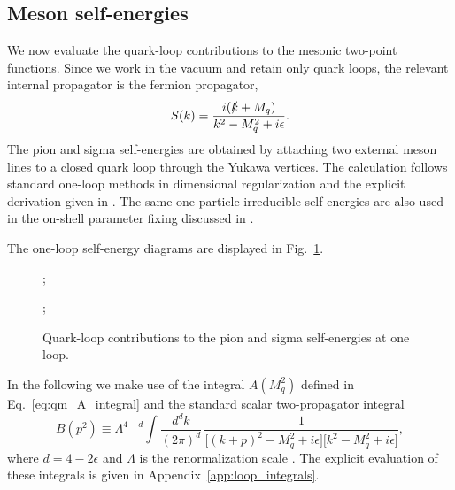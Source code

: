 \subsection*{Meson self-energies}

We now evaluate the quark-loop contributions to the mesonic two-point
functions. Since we work in the vacuum and retain only quark loops,
the relevant internal propagator is the fermion propagator,
\begin{equation}
S(k)=\frac{i(\slashed{k}+M_q)}{k^2-M_q^2+i\epsilon}.
\end{equation}
The pion and sigma self-energies are obtained by attaching two
external meson lines to a closed quark loop through the Yukawa
vertices. The calculation follows standard one-loop methods in
dimensional regularization \cite{PeskinSchroeder1995,WeinbergQFT} and
the explicit derivation given in \cite{Folkestad2018}. The same
one-particle-irreducible self-energies are also used in the on-shell
parameter fixing discussed in \cite{Andersen2024}.

The one-loop self-energy diagrams are displayed in
Fig.~\ref{fig:qm_selfenergy_diagrams}.

\begin{figure}[htbp]
\centering
\begin{minipage}{0.47\textwidth}
\centering
{};
\end{minipage}
\hfill
\begin{minipage}{0.47\textwidth}
\centering
{};
\end{minipage}
\caption{Quark-loop contributions to the pion and sigma self-energies at one loop.}
\label{fig:qm_selfenergy_diagrams}
\end{figure}

In the following we make use of the integral \(A(M_q^2)\) defined in
Eq.~\eqref{eq:qm_A_integral} and the standard scalar two-propagator integral
\begin{equation}
B(p^2)
\equiv
\Lambda^{4-d}
\int \frac{d^d k}{(2\pi)^d}\,
\frac{1}{\bigl[(k+p)^2-M_q^2+i\epsilon\bigr]\bigl[k^2-M_q^2+i\epsilon\bigr]},
\label{eq:qm_B_def}
\end{equation}
where \(d=4-2\epsilon\) and \(\Lambda\) is the renormalization scale
\cite{Folkestad2018,Andersen2024}. The explicit evaluation of these
integrals is given in Appendix~\ref{app:loop_integrals}.

